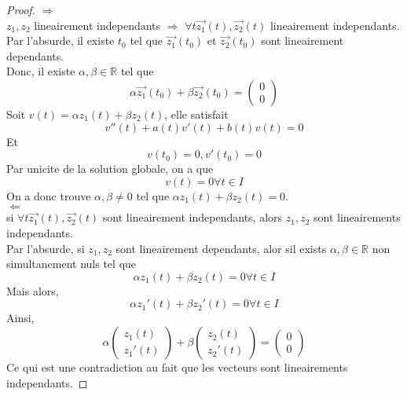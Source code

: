 \documentclass[../main.tex]{subfiles}
\begin{document}
\begin{proof}
$ \Rightarrow $ \\
$z_1, z_2$ lineairement independants $\Rightarrow$ $\forall t  \vec{z_1}( t) , \vec{z_2}( t) $ lineairement independants.\\
Par l'absurde, il existe $t_0$ tel que $\vec{z_1}( t_0) $ et $\vec{z_2}( t_0) $ sont lineairement dependants.\\
Donc, il existe $\alpha, \beta \in \mathbb{R}$ tel que
\[ 
	\alpha \vec{z_1}( t_0) + \beta \vec{z_2}( t_0) = \begin{pmatrix}
	0\\0
	\end{pmatrix} 
\]
Soit $v( t) = \alpha z_1( t) + \beta z_2( t) $, elle satisfait 
\[ 
	v''( t) + a( t) v'( t) + b( t) v( t) = 0
\]
Et
\[ 
	v( t_0) = 0, v'( t_0) =0
\]
Par unicite de la solution globale, on a que 
\[ 
	v( t) =0 \forall t \in I
\]
On a donc trouve $\alpha,\beta \neq 0$ tel que $\alpha z_1( t) + \beta z_2( t) =0$.\\
$\Leftarrow$ \\
si $\forall t \vec{z_1}( t) , \vec{z_2}( t) $ sont lineairement independants, alors $z_1, z_2$ sont lineairements independants.\\
Par l'absurde, si $z_1, z_2$ sont lineairement dependants, alor sil exists $\alpha, \beta \in \mathbb{R}$ non simultanement nuls tel que 
\[ 
	\alpha z_1( t) + \beta z_2( t) =0 \forall t \in I
\]
Mais alors, 
\[ 
	\alpha z_1'( t) + \beta z_2'( t) = 0 \forall t \in I
\]
Ainsi, 
\[ 
\alpha \begin{pmatrix}
	z_1( t) \\ z_1'( t) 
\end{pmatrix} + \beta \begin{pmatrix}
z_2( t) \\
z_2'( t) 
\end{pmatrix} = 
\begin{pmatrix}
0 \\0
\end{pmatrix} 
\]
Ce qui est une contradiction au fait que les vecteurs sont lineairements independants.	
\end{proof}
\end{document}
